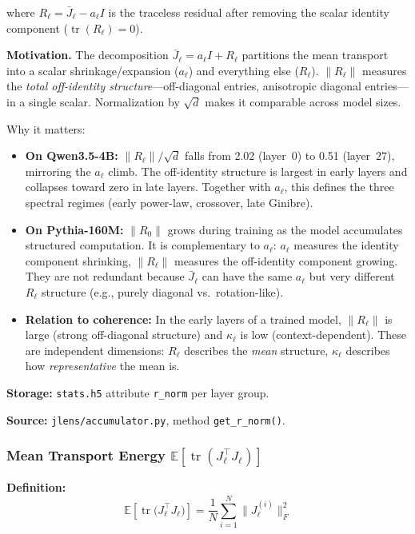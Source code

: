 \documentclass[11pt,a4paper]{article}
\begin{document}
where $R_\ell = \bar{J}_\ell - a_\ell I$ is the traceless residual after removing the scalar identity component ($\operatorname{tr}(R_\ell) = 0$).

\textbf{Motivation.} The decomposition $\bar{J}_\ell = a_\ell I + R_\ell$ partitions the mean transport into a scalar shrinkage/expansion ($a_\ell$) and everything else ($R_\ell$). $\|R_\ell\|$ measures the \emph{total off-identity structure}---off-diagonal entries, anisotropic diagonal entries---in a single scalar. Normalization by $\sqrt{d}$ makes it comparable across model sizes.

Why it matters:
\begin{itemize}
  \item \textbf{On Qwen3.5-4B:} $\|R_\ell\| / \sqrt{d}$ falls from 2.02 (layer~0) to 0.51 (layer~27), mirroring the $a_\ell$ climb. The off-identity structure is largest in early layers and collapses toward zero in late layers. Together with $a_\ell$, this defines the three spectral regimes (early power-law, crossover, late Ginibre).
  \item \textbf{On Pythia-160M:} $\|R_0\|$ grows during training as the model accumulates structured computation. It is complementary to $a_\ell$: $a_\ell$ measures the identity component shrinking, $\|R_\ell\|$ measures the off-identity component growing. They are not redundant because $\bar{J}_\ell$ can have the same $a_\ell$ but very different $R_\ell$ structure (e.g., purely diagonal vs.\ rotation-like).
  \item \textbf{Relation to coherence:} In the early layers of a trained model, $\|R_\ell\|$ is large (strong off-diagonal structure) and $\kappa_\ell$ is low (context-dependent). These are independent dimensions: $R_\ell$ describes the \emph{mean} structure, $\kappa_\ell$ describes how \emph{representative} the mean is.
\end{itemize}

\textbf{Storage:} \texttt{stats.h5} attribute \texttt{r\_norm} per layer group.

\textbf{Source:} \texttt{jlens/accumulator.py}, method \texttt{get\_r\_norm()}.

\subsubsection{Mean Transport Energy $\mathbb{E}[\operatorname{tr}(J_\ell^\top J_\ell)]$}
\label{sec:tr_jtj}

\textbf{Definition:}
\begin{equation}
  \mathbb{E}\!\left[\operatorname{tr}\!\big(J_\ell^\top J_\ell\big)\right]
  = \frac{1}{N} \sum_{i=1}^{N} \|J_\ell^{(i)}\|_F^2
\end{equation}
\end{document}
